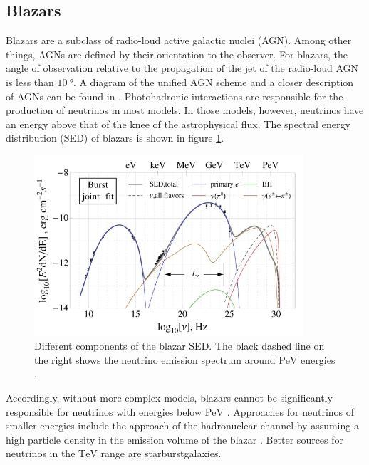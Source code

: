 \subsection{Blazars}
Blazars are a subclass of radio-loud active galactic nuclei (AGN).
Among other things, AGNs are defined by their orientation to the observer.
For blazars, the angle of observation relative to the propagation of the jet of the radio-loud AGN is less than $\SI{10}{\degree}$.
A diagram of the unified AGN scheme and a closer description of AGNs can be found in \cite{agn}.
Photohadronic interactions are responsible for the production of neutrinos in most models.
In those models, however, neutrinos have an energy above that of the knee of the astrophysical flux.
The spectral energy distribution (SED) of blazars is shown in figure \ref{fig:sed}.
\begin{figure}
    \centering
    \includegraphics[width=10cm]{Plots/01_5_astroparticle/sed.jpeg}
    \caption{Different components of the blazar SED. The black dashed line on the right shows the neutrino emission spectrum around $\si{\peta\electronvolt}$ energies \cite{sed}.}
    \label{fig:sed}
\end{figure}
Accordingly, without more complex models, blazars cannot be significantly responsible for neutrinos with energies below $\si{\peta\electronvolt}$ \cite{blazar}.
Approaches for neutrinos of smaller energies include the approach of the hadronuclear channel by assuming a high particle density in the emission volume of the blazar \cite{eichmann}.
Better sources for neutrinos in the $\si{\tera\electronvolt}$ range are starburstgalaxies.

